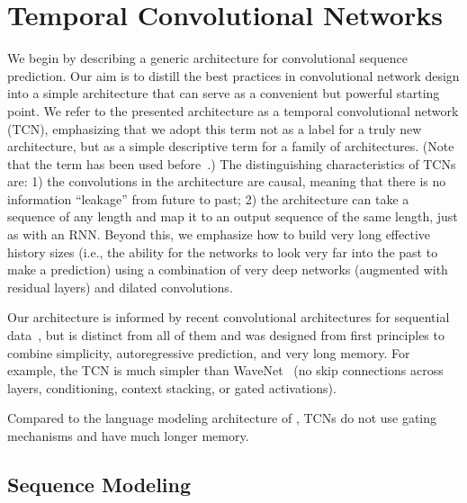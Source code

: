 \documentclass{article}
\begin{document}
\section{Temporal Convolutional Networks}
\label{technical-sec}

We begin by describing a generic architecture for convolutional sequence prediction.
Our aim is to distill the best practices in convolutional network design into a simple
architecture that can serve as a convenient but powerful starting point. We refer to the
presented architecture as a temporal convolutional network (TCN), emphasizing that we
adopt this term not as a label for a truly new architecture, but as a simple descriptive
term for a family of architectures. (Note that the term has been used before~\cite{Lea2017}.)
The distinguishing characteristics of TCNs are: 1) the convolutions in the architecture are
causal, meaning that there is no information ``leakage'' from future to past; 2) the
architecture can take a sequence of any length and map it to an output sequence of the
same length, just as with an RNN. Beyond this, we emphasize how to build very long effective
history sizes (i.e., the ability for the networks to look very far into the past to make a
prediction) using a combination of very deep networks (augmented with residual layers) and
dilated convolutions.

Our architecture is informed by recent convolutional architectures for sequential
data~\cite{waveNet,kalchbrenner2016neural,dauphinGatedConv,Gehring2017:ACL,gehring2017convolutional},
but is distinct from all of them and was designed from first principles to combine simplicity,
autoregressive prediction, and very long memory. For example, the TCN is much simpler than
WaveNet~\cite{waveNet} (no skip connections across layers, conditioning, context stacking,
or gated activations).

Compared to the language modeling architecture of \citet{dauphinGatedConv}, TCNs do not use
gating mechanisms and have much longer memory.

\subsection{Sequence Modeling}
\end{document}

